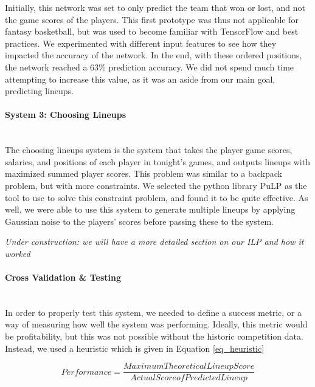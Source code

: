 Initially, this network was set to only predict the team that won or lost, and not the game scores of the players. This first prototype was thus not applicable for fantasy basketball, but was used to become familiar with TensorFlow and best practices. We experimented with different input features to see how they impacted the accuracy of the network. In the end, with these ordered positions, the network reached a 63\% prediction accuracy. %
We did not spend much time attempting to increase this value, as it was an aside from our main goal, predicting lineups.


\paragraph{System 3: Choosing Lineups}\mbox{}\\
The choosing lineups system is the system that takes the player game scores, salaries, and positions of each player in tonight's games, and outputs lineups with maximized summed player scores. This problem was similar to a backpack problem, but with more constraints. We selected the python library PuLP as the tool to use to solve this constraint problem, and found it to be quite effective. As well, we were able to use this system to generate multiple lineups by applying Gaussian noise to the players' scores before passing these to the system.

\textit{Under construction: we will have a more detailed section on our ILP and how it worked}

\paragraph{Cross Validation \& Testing}\mbox{}\\
In order to properly test this system, we needed to define a success metric, or a way of measuring how well the system was performing. Ideally, this metric would be profitability, but this was not possible without the historic competition data. Instead, we used a heuristic which is given in Equation \ref{eq_heuristic}

\begin{equation}
Performance = \frac{Maximum Theoretical Lineup Score}{Actual Score of Predicted Lineup}
\label{eq_heuristic}
\end{equation}

